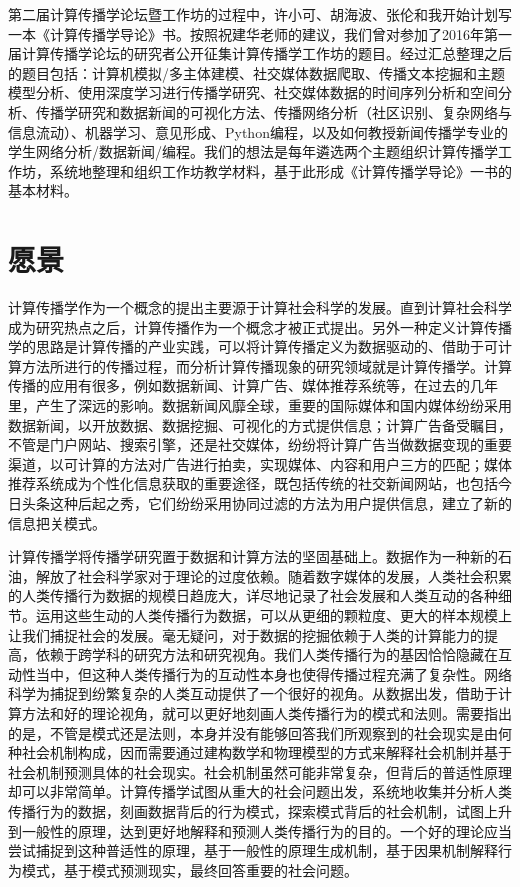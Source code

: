 \documentclass[letterpaper,10pt,english]{sphinxmanual}
\begin{document}
第二届计算传播学论坛暨工作坊的过程中，许小可、胡海波、张伦和我开始计划写一本《计算传播学导论》书。按照祝建华老师的建议，我们曾对参加了2016年第一届计算传播学论坛的研究者公开征集计算传播学工作坊的题目。经过汇总整理之后的题目包括：计算机模拟/多主体建模、社交媒体数据爬取、传播文本挖掘和主题模型分析、使用深度学习进行传播学研究、社交媒体数据的时间序列分析和空间分析、传播学研究和数据新闻的可视化方法、传播网络分析（社区识别、复杂网络与信息流动）、机器学习、意见形成、Python编程，以及如何教授新闻传播学专业的学生网络分析/数据新闻/编程。我们的想法是每年遴选两个主题组织计算传播学工作坊，系统地整理和组织工作坊教学材料，基于此形成《计算传播学导论》一书的基本材料。


\chapter{愿景}
\label{\detokenize{index:id3}}
计算传播学作为一个概念的提出主要源于计算社会科学的发展。直到计算社会科学成为研究热点之后，计算传播作为一个概念才被正式提出。另外一种定义计算传播学的思路是计算传播的产业实践，可以将计算传播定义为数据驱动的、借助于可计算方法所进行的传播过程，而分析计算传播现象的研究领域就是计算传播学。计算传播的应用有很多，例如数据新闻、计算广告、媒体推荐系统等，在过去的几年里，产生了深远的影响。数据新闻风靡全球，重要的国际媒体和国内媒体纷纷采用数据新闻，以开放数据、数据挖掘、可视化的方式提供信息；计算广告备受瞩目，不管是门户网站、搜索引擎，还是社交媒体，纷纷将计算广告当做数据变现的重要渠道，以可计算的方法对广告进行拍卖，实现媒体、内容和用户三方的匹配；媒体推荐系统成为个性化信息获取的重要途径，既包括传统的社交新闻网站，也包括今日头条这种后起之秀，它们纷纷采用协同过滤的方法为用户提供信息，建立了新的信息把关模式。

计算传播学将传播学研究置于数据和计算方法的坚固基础上。数据作为一种新的石油，解放了社会科学家对于理论的过度依赖。随着数字媒体的发展，人类社会积累的人类传播行为数据的规模日趋庞大，详尽地记录了社会发展和人类互动的各种细节。运用这些生动的人类传播行为数据，可以从更细的颗粒度、更大的样本规模上让我们捕捉社会的发展。毫无疑问，对于数据的挖掘依赖于人类的计算能力的提高，依赖于跨学科的研究方法和研究视角。我们人类传播行为的基因恰恰隐藏在互动性当中，但这种人类传播行为的互动性本身也使得传播过程充满了复杂性。网络科学为捕捉到纷繁复杂的人类互动提供了一个很好的视角。从数据出发，借助于计算方法和好的理论视角，就可以更好地刻画人类传播行为的模式和法则。需要指出的是，不管是模式还是法则，本身并没有能够回答我们所观察到的社会现实是由何种社会机制构成，因而需要通过建构数学和物理模型的方式来解释社会机制并基于社会机制预测具体的社会现实。社会机制虽然可能非常复杂，但背后的普适性原理却可以非常简单。计算传播学试图从重大的社会问题出发，系统地收集并分析人类传播行为的数据，刻画数据背后的行为模式，探索模式背后的社会机制，试图上升到一般性的原理，达到更好地解释和预测人类传播行为的目的。一个好的理论应当尝试捕捉到这种普适性的原理，基于一般性的原理生成机制，基于因果机制解释行为模式，基于模式预测现实，最终回答重要的社会问题。
\end{document}
